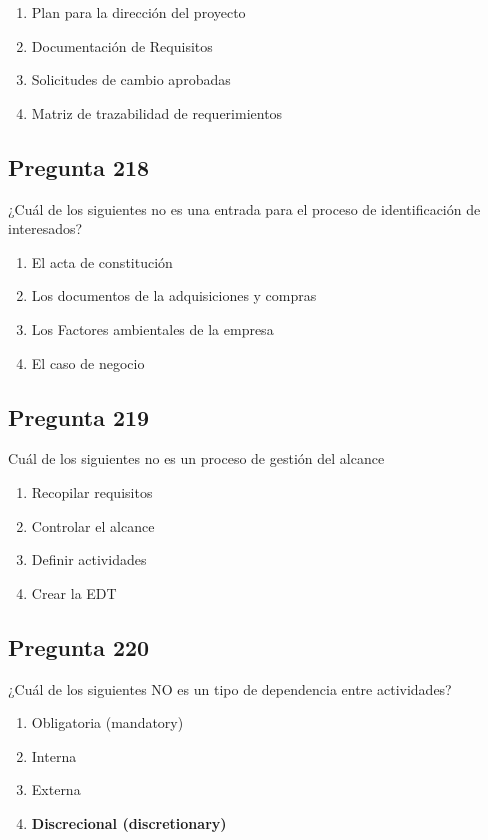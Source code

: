 \documentclass[11pt,a4paper]{article}
\begin{document}
\begin{enumerate}[label=\alph*)]
  \item Plan para la dirección del proyecto
  \item Documentación de Requisitos
  \item Solicitudes de cambio aprobadas
  \item Matriz de trazabilidad de requerimientos
\end{enumerate}

\subsection*{Pregunta 218}
¿Cuál de los siguientes no es una entrada para el proceso de identificación de interesados?

\begin{enumerate}[label=\alph*)]
  \item El acta de constitución
  \item Los documentos de la adquisiciones y compras
  \item Los Factores ambientales de la empresa
  \item El caso de negocio
\end{enumerate}

\subsection*{Pregunta 219}
Cuál de los siguientes no es un proceso de gestión del alcance

\begin{enumerate}[label=\alph*)]
  \item Recopilar requisitos
  \item Controlar el alcance
  \item Definir actividades
  \item Crear la EDT
\end{enumerate}

\subsection*{Pregunta 220}
¿Cuál de los siguientes NO es un tipo de dependencia entre actividades?

\begin{enumerate}[label=\alph*)]
  \item Obligatoria (mandatory)
  \item Interna
  \item Externa
  \item \textbf{Discrecional (discretionary)}
\end{enumerate}
\end{document}
